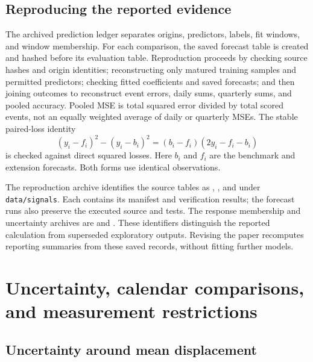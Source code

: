 \documentclass[12pt,letterpaper]{article}
\begin{document}
\subsection{Reproducing the reported evidence}
\label{app:reproduction}

The archived prediction ledger separates origins, predictors, labels, fit windows, and window membership. For each comparison, the saved forecast table is created and hashed before its evaluation table. Reproduction proceeds by checking source hashes and origin identities; reconstructing only matured training samples and permitted predictors; checking fitted coefficients and saved forecasts; and then joining outcomes to reconstruct event errors, daily sums, quarterly sums, and pooled accuracy. Pooled MSE is total squared error divided by total scored events, not an equally weighted average of daily or quarterly MSEs. The stable paired-loss identity
\[
 (y_i-f_i)^2-(y_i-b_i)^2=(b_i-f_i)(2y_i-f_i-b_i)
\]
is checked against direct squared losses. Here $b_i$ and $f_i$ are the benchmark and extension forecasts. Both forms use identical observations.

The reproduction archive identifies the source tables as , , and  under \texttt{data/signals}. Each contains its manifest and verification results; the forecast runs also preserve the executed source and tests. The response membership and uncertainty archives are  and . These identifiers distinguish the reported calculation from superseded exploratory outputs. Revising the paper recomputes reporting summaries from these saved records, without fitting further models.

\section{Uncertainty, calendar comparisons, and measurement restrictions}
\label{app:checks}

\subsection{Uncertainty around mean displacement}
\label{app:uncertainty}
\end{document}
